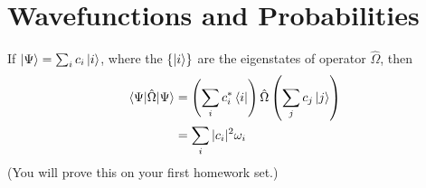 %
%
%
%

\section*{Wavefunctions and Probabilities}
	
	If $\ket{\Psi} = \sum_i c_i \ket{i}$, where the $\{\ket{i}\}$ are the eigenstates of operator $\hat\Omega$, then
	\begin{align*}
		\braket{\Psi|\hat\Omega|\Psi} &= \left(\sum_i c_i^* \bra{i}\right) \hat\Omega \left(\sum_j c_j \ket{j}\right)\\
			&= \sum_i |c_i|^2 \omega_i
	\end{align*}
	(You will prove this on your first homework set.)
	
